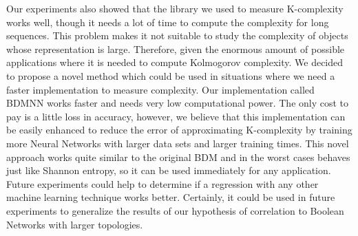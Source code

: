 Our experiments also showed that the library we used to measure K-complexity works well, though it needs a lot of time to compute the complexity for long sequences. This problem makes it not suitable to study the complexity of objects whose representation is large. Therefore, given the enormous amount of possible applications where it is needed to compute Kolmogorov complexity. We decided to propose a novel method which could be used in situations where we need a faster implementation to measure complexity. Our implementation called BDMNN works faster and needs very low computational power. The only cost to pay is a little loss in accuracy, however, we believe that this implementation can be easily enhanced to reduce the error of approximating K-complexity by training more Neural Networks with larger data sets and larger training times. This novel approach works quite similar to the original BDM and in the worst cases behaves just like Shannon entropy, so it can be used immediately for any application. Future experiments could help to determine if a regression with any other machine learning technique works better. Certainly, it could be used in future experiments to generalize the results of our hypothesis of correlation to Boolean Networks with larger topologies.




